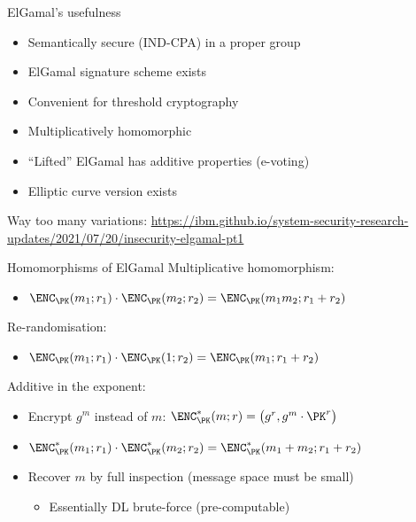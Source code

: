 \begin{frame}{ElGamal's usefulness}
  \begin{itemize}[<+(1)->]
    \item Semantically secure (IND-CPA) in a proper group
    \item ElGamal signature scheme exists
    \item Convenient for threshold cryptography
    \item Multiplicatively homomorphic
    \item \enquote{Lifted} ElGamal has additive properties (e-voting)
    \item Elliptic curve version exists
  \end{itemize}

  \pause
  Way too many variations: \url{https://ibm.github.io/system-security-research-updates/2021/07/20/insecurity-elgamal-pt1}
\end{frame}

\begin{frame}{Homomorphisms of ElGamal}
  \pause
  Multiplicative homomorphism:
  \begin{itemize}
    \item $\ENC_\PK(m_1; r_1) \cdot \ENC_\PK(m_2; r_2) = \ENC_\PK(m_1m_2; r_1 + r_2)$
  \end{itemize}

  \pause
  Re-randomisation:
  \begin{itemize}
    \item $\ENC_\PK(m_1; r_1) \cdot \ENC_\PK(1; r_2) = \ENC_\PK(m_1; r_1 + r_2)$
  \end{itemize}

  \pause
  Additive in the exponent:
  \begin{itemize}[<+(1)->]
    \item Encrypt $g^m$ instead of $m$: $\ENC^*_\PK(m; r) = \bigl(g^r, g^m \cdot \PK^r\bigr)$
    \item $\ENC^*_\PK(m_1; r_1) \cdot \ENC^*_\PK(m_2; r_2) = \ENC^*_\PK(m_1 + m_2; r_1 + r_2)$
    \item Recover $m$ by full inspection (message space must be small)
    \begin{itemize}
      \item Essentially DL brute-force (pre-computable)
    \end{itemize}
  \end{itemize}
\end{frame}

